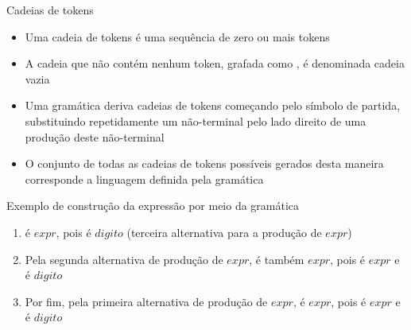 \begin{frame}[fragile]{Cadeias de tokens}

    \begin{itemize}
        \item Uma cadeia de tokens é uma sequência de zero ou mais tokens

        \item A cadeia que não contém nenhum token, grafada como , é denominada cadeia vazia

        \item Uma gramática deriva cadeias de tokens começando pelo símbolo de partida, substituindo repetidamente um não-terminal pelo lado direito de uma
            produção deste não-terminal

        \item O conjunto de todas as cadeias de tokens possíveis gerados desta maneira corresponde a linguagem definida pela gramática
    \end{itemize}

\end{frame}

\begin{frame}[fragile]{Exemplo de construção da expressão  por meio da gramática}

    \begin{enumerate}
        \item {} é $expr$, pois  é $digito$ (terceira alternativa para a produção de $expr$)

        \item Pela segunda alternativa de produção de $expr$,   é também $expr$, pois  é $expr$ e  é $digito$

        \item Por fim, pela primeira alternativa de produção de $expr$,  é $expr$, pois  é $expr$ e  é $digito$
    \end{enumerate}

\end{frame}

